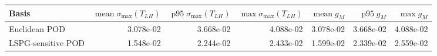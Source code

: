 \begin{tabular}{lrrrrrr}
\toprule
Basis & $\operatorname{mean}\sigma_{\max}(T_{LH})$ & $\operatorname{p95}\sigma_{\max}(T_{LH})$ & $\max\sigma_{\max}(T_{LH})$ & $\operatorname{mean}g_M$ & $\operatorname{p95}g_M$ & $\max g_M$ \\
\midrule
Euclidean POD & 3.078e-02 & 3.668e-02 & 4.088e-02 & 3.078e-02 & 3.668e-02 & 4.088e-02 \\
LSPG-sensitive POD & 1.548e-02 & 2.244e-02 & 2.433e-02 & 1.599e-02 & 2.339e-02 & 2.559e-02 \\
\bottomrule
\end{tabular}
